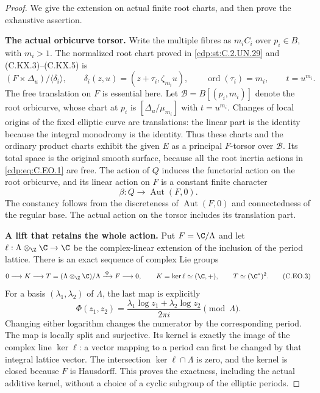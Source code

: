 \begin{proof}
We give the extension on actual finite root charts,
and then prove the exhaustive assertion.

\par\medskip\noindent\textbf{The actual orbicurve torsor.}
Write the multiple fibres as $m_iC_i$ over $p_i\in B$,
with $m_i>1$. The normalized root chart proved in
\ref{cdp:st:C.2.UN.29} and (C.KX.3)--(C.KX.5) is
\[
 (F\times\Delta_u)/\langle\delta_i\rangle,
 \qquad
 \delta_i(z,u)=(z+\tau_i,\zeta_{m_i}u),
 \qquad \operatorname{ord}(\tau_i)=m_i,
 \qquad t=u^{m_i}.
                                                               \tag{C.EO.1}\label{cdp:eq:C.EO.1}
\]
The free translation on $F$ is essential here.
Let $\mathcal B=B[(p_i,m_i)]$ denote the root
orbicurve, whose chart at $p_i$ is
$[\Delta_u/\mu_{m_i}]$ with $t=u^{m_i}$.
Changes of local origins of the fixed elliptic
curve are translations: the linear part is the
identity because the integral monodromy is the
identity. Thus these charts and the ordinary
product charts exhibit the given $E$ as a
principal $F$-torsor over $\mathcal B$.
Its total space is the original smooth surface,
because all the root inertia actions in \eqref{cdp:eq:C.EO.1}
are free. The action of $Q$ induces the functorial
action on the root orbicurve, and its linear action
on $F$ is a constant finite character
\[
                 \beta:Q\longrightarrow
                            \operatorname{Aut}(F,0).
                                                               \tag{C.EO.2}\label{cdp:eq:C.EO.2}
\]
The constancy follows from the discreteness of
$\operatorname{Aut}(F,0)$ and connectedness of
the regular base. The actual action on the
torsor includes its translation part.

\par\medskip\noindent\textbf{A lift that retains the whole action.}
Put $F=\C/\Lambda$ and let
$\ell:\Lambda\otimes_{\Z}\C\to\C$
be the complex-linear extension of the inclusion
of the period lattice. There is an exact sequence
of complex Lie groups
\[
 0\longrightarrow K\longrightarrow
 T=(\Lambda\otimes_{\Z}\C)/\Lambda
 \xrightarrow{\,\Phi\,}F\longrightarrow0,
 \qquad K=\ker\ell\simeq(\C,+),
 \qquad T\simeq(\C^*)^2.                              \tag{C.EO.3}\label{cdp:eq:C.EO.3}
\]
For a basis $(\lambda_1,\lambda_2)$ of $\Lambda$,
the last map is explicitly
\[
 \Phi(z_1,z_2)=
 \frac{\lambda_1\log z_1+\lambda_2\log z_2}{2\pi i}
                    \pmod\Lambda .                 \tag{C.EO.4}\label{cdp:eq:C.EO.4}
\]
Changing either logarithm changes the numerator
by the corresponding period. The map is locally
split and surjective. Its kernel is exactly
the image of the complex line $\ker\ell$:
a vector mapping to a period can first be
changed by that integral lattice vector.
The intersection $\ker\ell\cap\Lambda$ is zero,
and the kernel is closed because $F$ is Hausdorff.
This proves the exactness, including the actual
additive kernel, without a choice of a cyclic
subgroup of the elliptic periods.


\end{proof}
